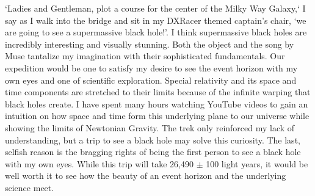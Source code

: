 \documentclass[11pt, letterpaper]{awesome-cv}
\begin{document}
\begin{cvletter}
`Ladies and Gentleman, plot a course for the center of the Milky Way Galaxy,` I
say as I walk into the bridge and sit in my DXRacer themed captain's chair, `we
are going to see a supermassive black hole!'. I think supermassive black holes
are incredibly interesting and visually stunning. Both the object and the song
by Muse tantalize my imagination with their sophisticated fundamentals. Our
expedition would be one to satisfy my desire to see the event horizon with my
own eyes and one of scientific exploration. Special relativity and its space and
time components are stretched to their limits because of the infinite warping
that black holes create. I have spent many hours watching YouTube videos to gain
an intuition on how space and time form this underlying plane to our universe
while showing the limits of Newtonian Gravity. The trek only reinforced my lack
of understanding, but a trip to see a black hole may solve this curiosity. The
last, selfish reason is the bragging rights of being the first person to see a
black hole with my own eyes.  While this trip will take 26,490 $\pm$ 100 light
years, it would be well worth it to see how the beauty of an event horizon and
the underlying science meet.

\end{cvletter}


\makeletterclosing
\end{document}
